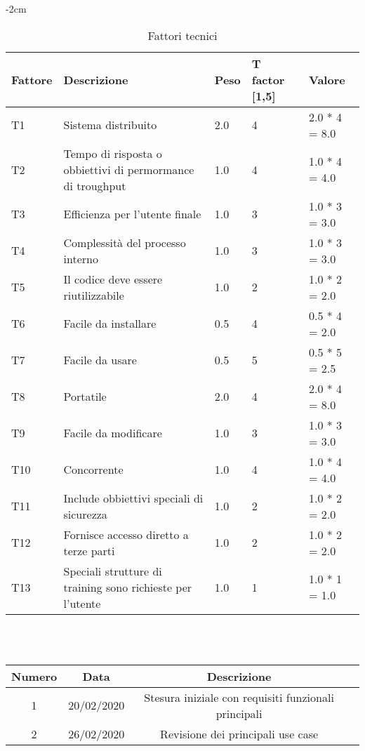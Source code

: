 \begin{table}[hb]
    \centering
        \addtolength{\leftskip} {-2cm}
\begin{tabular}{ |P{2.5cm}|P{5cm}|P{2.5cm}|P{2.5cm}|P{2.5cm}|  }
\hline
\textbf{Fattore} & \textbf{Descrizione} & \textbf{Peso} & \textbf{T factor [1,5]} & \textbf{Valore} \\\hline
T1 & Sistema distribuito & 2.0 & 4 & 2.0 * 4 = 8.0\\\hline
T2 & Tempo di risposta o obbiettivi di permormance di troughput & 1.0& 4& 1.0 * 4 = 4.0\\\hline
T3 & Efficienza per l'utente finale & 1.0& 3& 1.0 * 3 = 3.0\\\hline
T4 & Complessità del processo interno & 1.0& 3& 1.0 * 3 = 3.0\\\hline
T5 & Il codice deve essere riutilizzabile & 1.0& 2& 1.0 * 2 = 2.0\\\hline
T6 & Facile da installare & 0.5& 4& 0.5 * 4 = 2.0\\\hline
T7 & Facile da usare & 0.5& 5& 0.5 * 5 = 2.5\\\hline
T8 & Portatile & 2.0& 4& 2.0 * 4 = 8.0\\\hline
T9 & Facile da modificare & 1.0& 3& 1.0 * 3 = 3.0\\\hline
T10 & Concorrente & 1.0& 4& 1.0 * 4 = 4.0\\\hline
T11 & Include obbiettivi speciali di sicurezza & 1.0& 2& 1.0 * 2 = 2.0\\\hline
T12 & Fornisce accesso diretto a terze parti & 1.0& 2& 1.0 * 2 = 2.0\\\hline
T13 & Speciali strutture di training sono richieste per l'utente & 1.0& 1& 1.0 * 1 = 1.0\\\hline
\end{tabular}
\caption{Fattori tecnici}
\end{table}

\begin{table}[b]
 \\ \\
\begin{tabular}{|c | c | c | c|} 
 	\hline
	 Numero & Data & Descrizione \\ [0.5ex] 
	\hline\hline
	1 & 20/02/2020 & Stesura iniziale con requisiti funzionali principali \\
	\hline
	2 & 26/02/2020 & Revisione dei principali use case\\
	\hline
\end{tabular}
\end{table}
